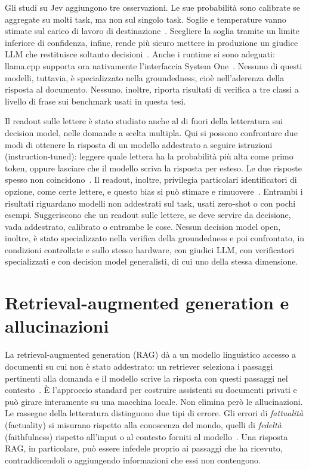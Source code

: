 Gli studi su Jev aggiungono tre osservazioni. Le sue probabilità sono calibrate se aggregate su molti task, ma non sul
singolo task. Soglie e temperature vanno stimate sul carico di lavoro di destinazione~\cite{guo2026justaskjev,li2026jevjudge}.
Scegliere la soglia tramite un limite inferiore di confidenza, infine, rende più sicuro mettere in produzione un giudice LLM
che restituisce soltanto decisioni~\cite{li2026jevjudge}. Anche i runtime si sono adeguati: llama.cpp supporta ora
nativamente l'interfaccia System One~\cite{llamacpp}. Nessuno di questi modelli, tuttavia, è specializzato nella
groundedness, cioè nell'aderenza della risposta al documento. Nessuno, inoltre, riporta risultati di verifica a tre classi
a livello di frase sui benchmark usati in questa tesi.

Il readout sulle lettere è stato studiato anche al di fuori della letteratura sui decision model, nelle domande a scelta
multipla. Qui si possono confrontare due modi di ottenere la risposta di un modello addestrato a seguire istruzioni
(instruction-tuned): leggere quale lettera ha la probabilità più alta come primo token, oppure lasciare che il modello
scriva la risposta per esteso. Le due risposte spesso non coincidono~\cite{wang2024myanswerc}. Il readout, inoltre,
privilegia particolari identificatori di opzione, come certe lettere, e questo bias si può stimare e
rimuovere~\cite{zheng2024mcq}. Entrambi i risultati riguardano modelli non addestrati sul task, usati zero-shot o con pochi esempi. Suggeriscono che un readout sulle
lettere, se deve servire da decisione, vada addestrato, calibrato o entrambe le cose. Nessun decision model open, inoltre, è
stato specializzato nella verifica della groundedness e poi confrontato, in condizioni controllate e sullo stesso
hardware, con giudici LLM, con verificatori specializzati e con decision model generalisti, di cui uno della stessa
dimensione.

\section{Retrieval-augmented generation e allucinazioni}
\label{sec:bg-rag}

La retrieval-augmented generation (RAG) dà a un modello linguistico accesso a documenti su cui non è stato addestrato: un
retriever seleziona i passaggi pertinenti alla domanda e il modello scrive la risposta con questi passaggi nel
contesto~\cite{lewis2020rag}. È l'approccio standard per costruire assistenti su documenti privati e può girare
interamente su una macchina locale. Non elimina però le allucinazioni. Le rassegne della letteratura distinguono due tipi
di errore. Gli errori di \emph{fattualità} (factuality) si misurano rispetto alla conoscenza del mondo, quelli di
\emph{fedeltà} (faithfulness) rispetto all'input o al contesto forniti al modello~\cite{huang2025hallucination}. Una
risposta RAG, in particolare, può essere infedele proprio ai passaggi che ha ricevuto, contraddicendoli o aggiungendo
informazioni che essi non contengono.

